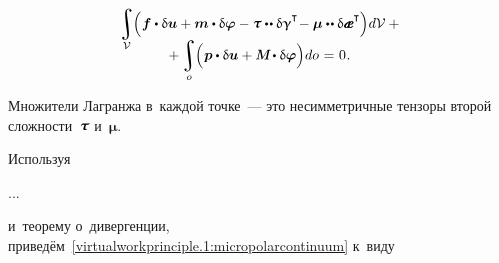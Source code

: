 \begin{otherlanguage}{russian}
\nopagebreak\vspace{-0.33em}
\begin{multline}\label{virtualworkprinciple.1:micropolarcontinuum}
\integral\displaylimits_{\mathcal{V}} \hspace{-0.64ex} \left(^{\mathstrut} \bm{f} \dotp \variation{\fieldofdisplacements}
+ \bm{m} \dotp \variation{\fieldofrotations}
- \mathboldtau \dotdotp \variation{\bm{\upgamma}}^{\T} \hspace{-0.4ex}
- \bm{\mu} \dotdotp \variation{\mathboldae}^{\T} \hspace{-0.05ex} \right) \hspace{-0.32ex} d\mathcal{V} \hspace{.5ex} + \\[-1.1em]
+ \integral\displaylimits_o \hspace{-0.64ex} \left(^{\mathstrut} \bm{p} \dotp \variation{\fieldofdisplacements}
+ \mathboldM \hspace{-0.1ex} \dotp \variation{\fieldofrotations} \right) \hspace{-0.32ex} do \hspace{0.12ex} = \hspace{0.1ex} 0 \hspace{0.1ex}.
\end{multline}

\vspace{-0.2em} \noindent Множители Лагранжа в~каждой точке~--- это несимметричные тензоры второй сложности~$\mathboldtau$ и~$\bm{\mu}$.

Используя

...

\noindent и~теорему о~дивергенции, приведём~\eqref{virtualworkprinciple.1:micropolarcontinuum} к~виду


\end{otherlanguage}
